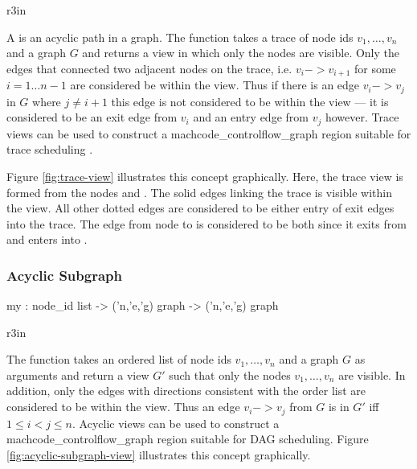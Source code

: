 \begin{wrapfigure}{r}{3in}
  \begin{Boxit}
  \end{Boxit}
  \label{fig:trace-view}
  \caption{A trace view}
\end{wrapfigure}
A  is an acyclic path in a graph.
The function  takes a trace of node ids
$v_1,\ldots,v_n$ and a graph $G$ and 
returns a view in which only the nodes are visible.
Only the edges that connected two adjacent nodes on the trace, i.e. 
$v_i -> v_{i+1}$ for some $i = 1 \ldots n-1$ are considered be within
the view.  Thus if there is an edge $v_i -> v_j$ in $G$ where
$j \ne i+1$ this edge is not considered to be within the view --- it
is considered to be an exit edge from $v_i$ and an entry edge
from $v_j$ however.  Trace views can be used to construct a machcode_controlflow_graph region
suitable for trace scheduling \cite{trace-scheduling,bulldog}.   

Figure \ref{fig:trace-view} illustrates this concept graphically.
Here, the trace view is formed from the
nodes  and .  The
solid edges linking the trace is visible within the view.  All other
dotted edges are considered to be either entry of exit edges into
the trace.  The edge from node  to  is considered to
be both since it exits from  and enters into .

\subsubsection{Acyclic Subgraph}
\begin{SML}
   my  : 
     node_id list -> 
     ('n,'e,'g) graph -> ('n,'e,'g) graph
\end{SML}
\begin{wrapfigure}{r}{3in}
  \begin{Boxit}
  \end{Boxit}
  \label{fig:acyclic-subgraph-view}
  \caption{An acyclic subgraph}
\end{wrapfigure}
The function  takes an ordered
list of node ids $v_1,\ldots,v_n$ and a graph $G$ as arguments
and return a view $G'$ such that only the nodes $v_1,\ldots,v_n$
are visible.  In addition, only the edges with directions consistent
with the order list are considered to be within the view.
Thus an edge $v_i -> v_j$ from $G$ is in $G'$ iff $1 \le i < j \le n$.
Acyclic views can be used to construct a machcode_controlflow_graph region suitable
for DAG scheduling.
Figure \ref{fig:acyclic-subgraph-view} illustrates this concept graphically.

